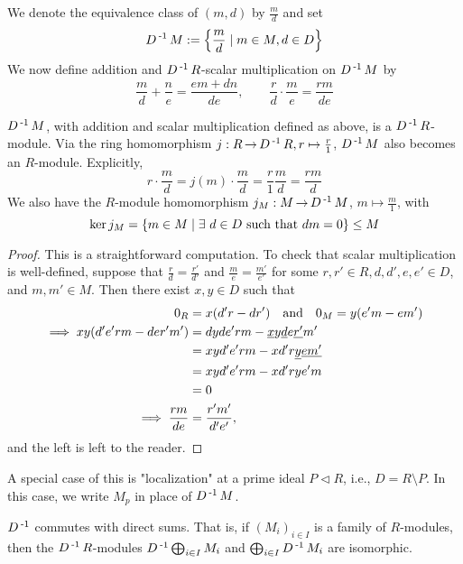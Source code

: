 \documentclass[11pt]{book}
\theoremstyle{definition}   \newtheorem{defn}[counter]{Definition} %
\newcommand{\bs}{\setminus}   \newcommand{\A}{\mathcal{A}}   \newcommand{\sy}{\textnormal{Syl}}   \newcommand{\size}[1]{\left| #1 \right|}
\DeclareMathOperator{\ra}{\rightarrow}   \DeclareMathOperator{\Poly}{\mathbf{P}}   \DeclareMathOperator{\spn}{\textnormal{span}}   \DeclareMathOperator{\aut}{\textnormal{Aut}}
\newcommand{\vs}{\vspace{8pt}}
\numberwithin{counter}{chapter}
\begin{document}
We denote the equivalence class of $(m,d)$ by $\frac{m}{d}$ and set
	\[ D\operatorname{^{-1}} M := \left\{\frac{m}{d} \mid m \in M, d \in D \right\} \]
We now define addition and $D\operatorname{^{-1}} R$-scalar multiplication on $D\operatorname{^{-1}} M$ by
	\[\frac{m}{d} + \frac{n}{e} = \frac{em + dn}{de}, \qquad \frac{r}{d} \cdot \frac{m}{e} = \frac{rm}{de} \]

\vs

\begin{lemma}
$D\operatorname{^{-1}} M$, with addition and scalar multiplication defined as above, is a $D\operatorname{^{-1}} R$-module. Via the ring homomorphism $j : R \ra D\inv R, r \mapsto \frac{r}{1}$, $D\operatorname{^{-1}} M$ also becomes an $R$-module. Explicitly,
	\[r \cdot \frac{m}{d} = j(m) \cdot \frac{m}{d} = \frac{r}{1} \frac{m}{d} = \frac{rm}{d} \]
We also have the $R$-module homomorphism $j_M : M \ra D\inv M$, $m \mapsto \frac{m}{1}$, with
	\[\ker j_M = \{m \in M \mid \exists \ d \in D \textnormal{ such that } dm = 0 \} \leq M \]
\end{lemma}

\begin{proof}
This is a straightforward computation. To check that scalar multiplication is well-defined, suppose that $\frac{r}{d} = \frac{r'}{d'}$ and $\frac{m}{e} = \frac{m'}{e'}$ for some $r,r' \in R, d,d',e,e' \in D$, and $m,m' \in M$. Then there exist $x,y \in D$ such that
\begin{align*}
0_R &= x(d'r-dr') \quad \textnormal{and} \quad 0_M = y(e'm-em') \\
\implies xy(d'e'rm - der'm') &= dyde'rm - \underline{x} y \underline{d} e \underline{r'} m' \\
&= xyd'e'rm - xd'r\underline{y} \underline{e} \underline{m'} \\
&= xyd'e'rm - xd'rye'm \\
&= 0 \\
\implies \frac{rm}{de} &= \frac{r'm'}{d'e'},
\end{align*}
and the left is left to the reader.
\end{proof}

\vs

A special case of this is "localization" at a prime ideal $P \vartriangleleft R$, i.e., $D = R \bs P$. In this case, we write $M_p$ in place of $D\operatorname{^{-1}} M$.

\vs

\begin{lemma}
$D\operatorname{^{-1}}$ commutes with direct sums. That is, if $(M_i)_{i \in I}$ is a family of $R$-modules, then the $D\operatorname{^{-1}} R$-modules $D\operatorname{^{-1}} \bigoplus_{i \in I} M_i$ and $\bigoplus_{i \in I} D\operatorname{^{-1}} M_i$ are isomorphic.
\end{lemma}
\end{document}
